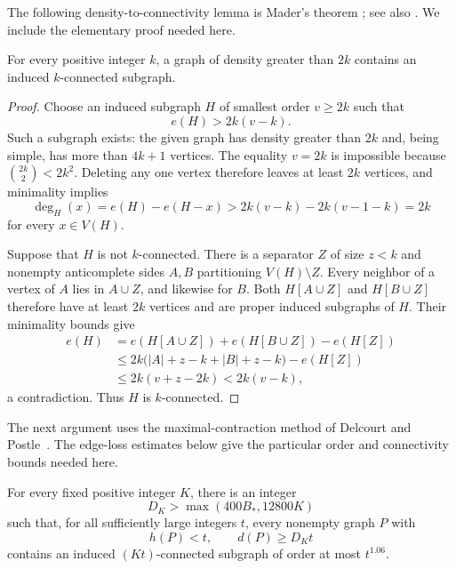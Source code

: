 The following density-to-connectivity lemma is Mader's theorem
\cite{Mader1972}; see also \cite[Lemma~4.4]{DelcourtPostle2021}.
We include the elementary proof needed here.

\begin{lemma}\label{density:connectivity}
For every positive integer \(k\), a graph of density greater than \(2k\)
contains an induced \(k\)-connected subgraph.
\end{lemma}

\begin{proof}
Choose an induced subgraph \(H\) of smallest order \(v\ge2k\) such that
\[
 e(H)>2k(v-k).
\]
Such a subgraph exists: the given graph has density greater than \(2k\)
and, being simple, has more than \(4k+1\) vertices.
The equality \(v=2k\) is impossible because
\(\binom{2k}{2}<2k^2\).
Deleting any one vertex therefore leaves at least \(2k\) vertices,
and minimality implies
\[
 \deg_H(x)
 =e(H)-e(H-x)
 >2k(v-k)-2k(v-1-k)=2k
\]
for every \(x\in V(H)\).

Suppose that \(H\) is not \(k\)-connected. There is a separator \(Z\)
of size \(z<k\) and nonempty anticomplete sides \(A,B\) partitioning
\(V(H)\setminus Z\).
Every neighbor of a vertex of \(A\) lies in \(A\cup Z\), and likewise
for \(B\). Both \(H[A\cup Z]\) and \(H[B\cup Z]\) therefore have at
least \(2k\) vertices and are proper induced subgraphs of \(H\).
Their minimality bounds give
\[
 \begin{aligned}
 e(H)
 &=e(H[A\cup Z])+e(H[B\cup Z])-e(H[Z])\\
 &\le2k\bigl(|A|+z-k+|B|+z-k\bigr)-e(H[Z])\\
 &\le2k(v+z-2k)
 <2k(v-k),
 \end{aligned}
\]
a contradiction. Thus \(H\) is \(k\)-connected.
\end{proof}

The next argument uses the maximal-contraction method of Delcourt and
Postle~\cite{DelcourtPostle2021}. The edge-loss estimates below give the
particular order and connectivity bounds needed here.

\begin{lemma}\label{lem:district}
For every fixed positive integer \(K\), there is an integer
\[
 D_K>\max(400B_*,12800K)
\]
such that, for all sufficiently large integers \(t\), every nonempty
graph \(P\) with
\[
 h(P)<t,\qquad d(P)\ge D_Kt
\]
contains an induced \((Kt)\)-connected subgraph of order at most
\(t^{1.06}\).
\end{lemma}

